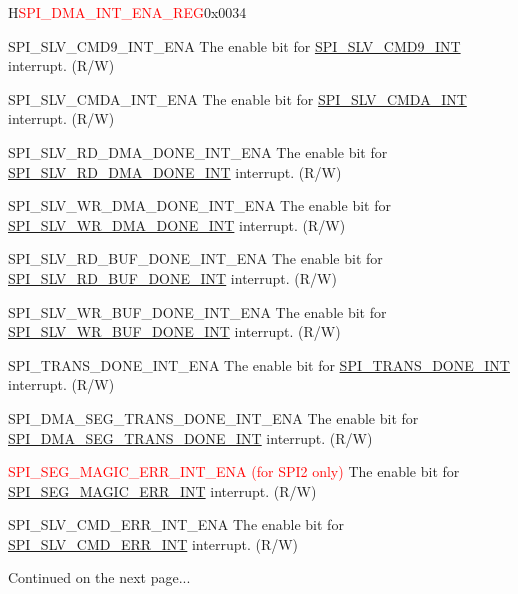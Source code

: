 \begin{register}{H}{\textcolor{red}{SPI\_DMA\_INT\_ENA\_REG}}{0x{}0034}
\begin{regdesc}
\begin{reglist}
\label{fielddesc:SPISLVCMD9INTENA}\item [SPI\_SLV\_CMD9\_INT\_ENA] The enable bit for \hyperref[int:SPISLVCMD9INT]{SPI\_SLV\_CMD9\_INT} interrupt. (R/W)
\label{fielddesc:SPISLVCMDAINTENA}\item [SPI\_SLV\_CMDA\_INT\_ENA] The enable bit for \hyperref[int:SPISLVCMDAINT]{SPI\_SLV\_CMDA\_INT} interrupt. (R/W)
\label{fielddesc:SPISLVRDDMADONEINTENA}\item [SPI\_SLV\_RD\_DMA\_DONE\_INT\_ENA] The enable bit for \hyperref[int:SPISLVRDDMADONEINT]{SPI\_SLV\_RD\_DMA\_DONE\_INT} interrupt. (R/W)
\label{fielddesc:SPISLVWRDMADONEINTENA}\item [SPI\_SLV\_WR\_DMA\_DONE\_INT\_ENA] The enable bit for \hyperref[int:SPISLVWRDMADONEINT]{SPI\_SLV\_WR\_DMA\_DONE\_INT} interrupt. (R/W)
\label{fielddesc:SPISLVRDBUFDONEINTENA}\item [SPI\_SLV\_RD\_BUF\_DONE\_INT\_ENA] The enable bit for \hyperref[int:SPISLVRDBUFDONEINT]{SPI\_SLV\_RD\_BUF\_DONE\_INT} interrupt. (R/W)
\label{fielddesc:SPISLVWRBUFDONEINTENA}\item [SPI\_SLV\_WR\_BUF\_DONE\_INT\_ENA] The enable bit for \hyperref[int:SPISLVWRBUFDONEINT]{SPI\_SLV\_WR\_BUF\_DONE\_INT} interrupt. (R/W)
\label{fielddesc:SPITRANSDONEINTENA}\item [SPI\_TRANS\_DONE\_INT\_ENA] The enable bit for \hyperref[int:SPITRANSDONEINT]{SPI\_TRANS\_DONE\_INT} interrupt. (R/W)
\label{fielddesc:SPIDMASEGTRANSDONEINTENA}\item [SPI\_DMA\_SEG\_TRANS\_DONE\_INT\_ENA] The enable bit for \hyperref[int:SPIDMASEGTRANSDONEINT]{SPI\_DMA\_SEG\_TRANS\_DONE\_INT} interrupt. (R/W)
\label{fielddesc:SPISEGMAGICERRINTENA}\item [\textcolor{red}{SPI\_SEG\_MAGIC\_ERR\_INT\_ENA (for SPI2 only)}] The enable bit for \hyperref[int:SPISEGMAGICERRINT]{SPI\_SEG\_MAGIC\_ERR\_INT} interrupt. (R/W)
\label{fielddesc:SPISLVCMDERRINTENA}\item [SPI\_SLV\_CMD\_ERR\_INT\_ENA] The enable bit for \hyperref[int:SPISLVCMDERRINT]{SPI\_SLV\_CMD\_ERR\_INT} interrupt. (R/W)

\item [Continued on the next page...]
\end{reglist}\end{regdesc}
\end{register}

